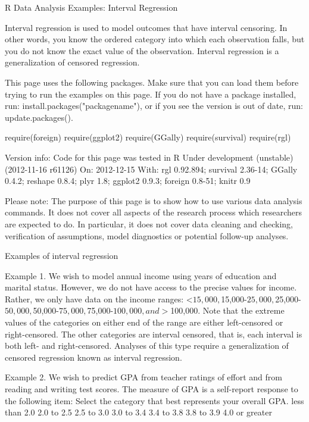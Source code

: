 R Data Analysis Examples: Interval Regression

Interval regression is used to model outcomes that have interval censoring. In other words, you know the ordered category into which each observation falls, but you do not know the exact value of the observation. Interval regression is a generalization of censored regression.

This page uses the following packages. Make sure that you can load them before trying to run the examples on this page. If you do not have a package installed, run: install.packages("packagename"), or if you see the version is out of date, run: update.packages().
 


require(foreign)
require(ggplot2)
require(GGally)
require(survival)
require(rgl)

 Version info: Code for this page was tested in R Under development (unstable) (2012-11-16 r61126)
 On: 2012-12-15
 With: rgl 0.92.894; survival 2.36-14; GGally 0.4.2; reshape 0.8.4; plyr 1.8; ggplot2 0.9.3; foreign 0.8-51; knitr 0.9
 
Please note: The purpose of this page is to show how to use various data analysis commands. It does not cover all aspects of the research process which researchers are expected to do. In particular, it does not cover data cleaning and checking, verification of assumptions, model diagnostics or potential follow-up analyses.

Examples of interval regression

Example 1. We wish to model annual income using years of education and marital status. However, we do not have access to the precise values for income. Rather, we only have data on the income ranges: <$15,000, $15,000-$25,000, $25,000-$50,000, $50,000-$75,000, $75,000-$100,000, and >$100,000. Note that the extreme values of the categories on either end of the range are either left-censored or right-censored. The other categories are interval censored, that is, each interval is both left- and right-censored. Analyses of this type require a generalization of censored regression known as interval regression.

Example 2. We wish to predict GPA from teacher ratings of effort and from reading and writing test scores. The measure of GPA is a self-report response to the following item:
 Select the category that best represents your overall GPA.
  less than 2.0
  2.0 to 2.5
  2.5 to 3.0
  3.0 to 3.4
  3.4 to 3.8
  3.8 to 3.9
  4.0 or greater

